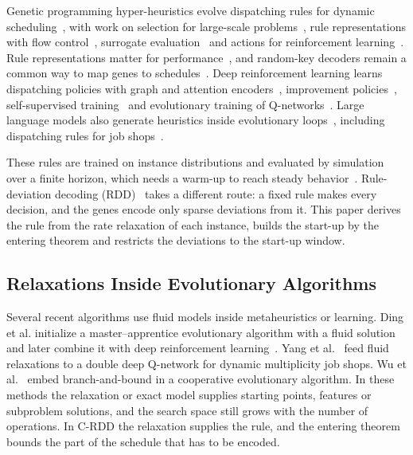 Genetic programming hyper-heuristics evolve dispatching rules for dynamic scheduling~\cite{zhang2024survey}, with work on selection for large-scale problems~\cite{xu2024lexicase}, rule representations with flow control~\cite{huang2025grammar,huang2025crossrep}, surrogate evaluation~\cite{zhang2023instancerotation} and actions for reinforcement learning~\cite{xu2026niching}.
Rule representations matter for performance~\cite{branke2015representations}, and random-key decoders remain a common way to map genes to schedules~\cite{londe2025brkga}.
Deep reinforcement learning learns dispatching policies with graph and attention encoders~\cite{song2023fjsp,wang2024dan}, improvement policies~\cite{zhang2024iclr}, self-supervised training~\cite{corsini2024selflabeling} and evolutionary training of Q-networks~\cite{liu2025trainer}.
Large language models also generate heuristics inside evolutionary loops~\cite{romeraparedes2024funsearch,liu2024eoh,ye2024reevo,zheng2025mctsahd}, including dispatching rules for job shops~\cite{huang2026llmdjss,yu2026lsh}.

These rules are trained on instance distributions and evaluated by simulation over a finite horizon, which needs a warm-up to reach steady behavior~\cite{hildebrandt2010towards}.
Rule-deviation decoding (RDD)~\cite{rdd} takes a different route: a fixed rule makes every decision, and the genes encode only sparse deviations from it.
This paper derives the rule from the rate relaxation of each instance, builds the start-up by the entering theorem and restricts the deviations to the start-up window.

\subsection{Relaxations Inside Evolutionary Algorithms}

Several recent algorithms use fluid models inside metaheuristics or learning.
Ding et al. initialize a master--apprentice evolutionary algorithm with a fluid solution~\cite{ding2024hfmae} and later combine it with deep reinforcement learning~\cite{ding2025swevo}.
Yang et al.~\cite{yang2025asoc} feed fluid relaxations to a double deep Q-network for dynamic multiplicity job shops.
Wu et al.~\cite{wu2025bbcea} embed branch-and-bound in a cooperative evolutionary algorithm.
In these methods the relaxation or exact model supplies starting points, features or subproblem solutions, and the search space still grows with the number of operations.
In C-RDD the relaxation supplies the rule, and the entering theorem bounds the part of the schedule that has to be encoded.
